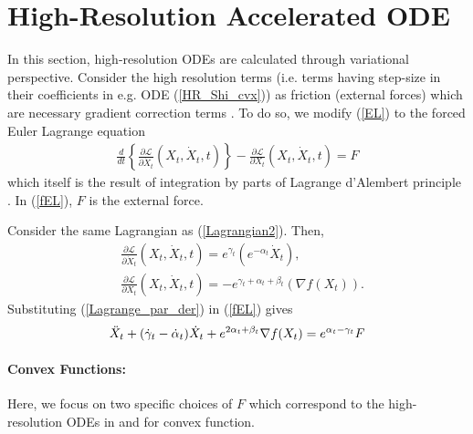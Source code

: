 \documentclass{article}
\theoremstyle{plain}
\theoremstyle{definition}
\theoremstyle{remark}
\begin{document}
\section{High-Resolution Accelerated ODE}\label{sec_HR_ODE}
In this section, high-resolution ODEs are calculated through variational perspective. Consider the high resolution terms (i.e. terms having step-size in their coefficients in e.g. ODE (\ref{HR_Shi_cvx})) as friction (external forces) which are necessary gradient correction terms \cite{Shi2021UnderstandingTA}. To do so, we modify (\ref{EL}) to the forced Euler Lagrange equation
\begin{align}\label{fEL}
        \frac{d}{dt}\left\{  \frac{\partial \mathcal{L}}{\partial \dot{X}_t}(X_t,\dot{X}_t,t)  \right\}-\frac{\partial \mathcal{L}}{\partial X_t}(X_t,\dot{X}_t,t)=F 
\end{align}
which itself is the result of integration by parts of Lagrange d'Alembert principle \cite{campos2021discrete}. In (\ref{fEL}), $F$ is the external force.\par 
Consider the same Lagrangian as (\ref{Lagrangian2}). Then,
\begin{align}\label{Lagrange_par_der}
  &   \frac{\partial \mathcal{L}}{\partial \dot{X}_t}(X_t,\dot{X}_t,t)  =e^{\gamma_t}(e^{-\alpha_t}\dot{X}_t),\nonumber\\
  & \frac{\partial \mathcal{L}}{\partial X_t}(X_t,\dot{X}_t,t)= -e^{\gamma_t+\alpha_t+\beta_t}(\nabla f(X_t)).
\end{align}
Substituting (\ref{Lagrange_par_der}) in (\ref{fEL}) gives
\begin{align}\label{HR_general_ODE_F}
    \Ddot{X}_t + (\dot{\gamma}_t-\dot{\alpha}_t)\dot{X}_t+e^{2\alpha_t+\beta_t}\nabla f(X_t) =e^{\alpha_t-\gamma_t} F
\end{align}
\paragraph{Convex Functions:} Here, we focus on two specific choices of $F$ which correspond to the high-resolution ODEs in \cite{pmlr-v108-laborde20a} and \cite{shi2019acceleration} for convex function.
\end{document}
